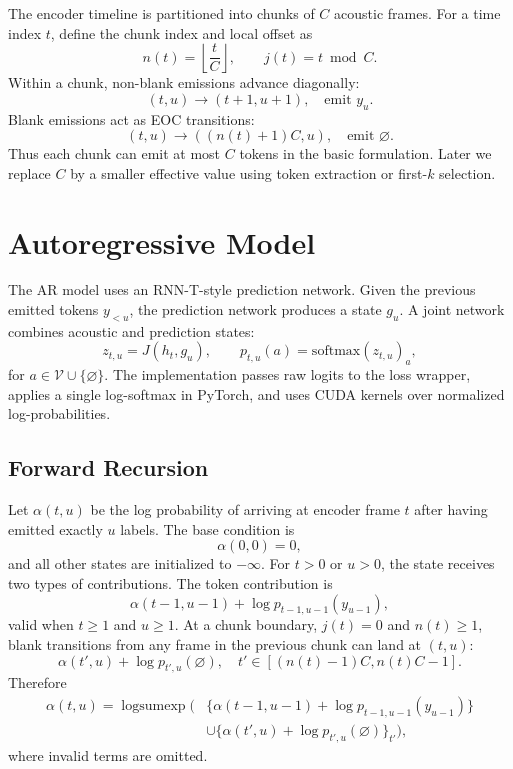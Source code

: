 \documentclass[conference]{IEEEtran}
\newcommand{\blank}{\varnothing}
\newcommand{\logsumexp}{\operatorname{logsumexp}}
\begin{document}
The encoder timeline is partitioned into chunks of $C$ acoustic frames. For a
time index $t$, define the chunk index and local offset as
\begin{equation}
  n(t) = \left\lfloor \frac{t}{C} \right\rfloor, \qquad
  j(t) = t \bmod C.
\end{equation}
Within a chunk, non-blank emissions advance diagonally:
\begin{equation}
  (t,u) \rightarrow (t+1,u+1), \quad \text{emit } y_u.
\end{equation}
Blank emissions act as EOC transitions:
\begin{equation}
  (t,u) \rightarrow ((n(t)+1)C, u), \quad \text{emit } \blank.
\end{equation}
Thus each chunk can emit at most $C$ tokens in the basic formulation. Later we
replace $C$ by a smaller effective value using token extraction or first-$k$
selection.

\section{Autoregressive Model}

The AR model uses an RNN-T-style prediction network. Given the previous emitted
tokens $y_{<u}$, the prediction network produces a state $g_u$. A joint network
combines acoustic and prediction states:
\begin{equation}
  z_{t,u} = J(h_t, g_u),
  \qquad
  p_{t,u}(a) = \mathrm{softmax}(z_{t,u})_a,
\end{equation}
for $a \in \mathcal{V} \cup \{\blank\}$. The implementation passes raw logits to
the loss wrapper, applies a single log-softmax in PyTorch, and uses CUDA kernels
over normalized log-probabilities.

\subsection{Forward Recursion}

Let $\alpha(t,u)$ be the log probability of arriving at encoder frame $t$ after
having emitted exactly $u$ labels. The base condition is
\begin{equation}
  \alpha(0,0) = 0,
\end{equation}
and all other states are initialized to $-\infty$. For $t>0$ or $u>0$, the state
receives two types of contributions. The token contribution is
\begin{equation}
  \alpha(t-1,u-1) + \log p_{t-1,u-1}(y_{u-1}),
\end{equation}
valid when $t \ge 1$ and $u \ge 1$. At a chunk boundary, $j(t)=0$ and
$n(t)\ge1$, blank transitions from any frame in the previous chunk can land at
$(t,u)$:
\begin{equation}
  \alpha(t',u) + \log p_{t',u}(\blank),
  \quad t' \in [(n(t)-1)C, n(t)C-1].
\end{equation}
Therefore
\begin{align}
  \alpha(t,u) =
  \logsumexp \Big(&
  \{\alpha(t-1,u-1)+\log p_{t-1,u-1}(y_{u-1})\} \nonumber\\
  &\cup
  \{\alpha(t',u)+\log p_{t',u}(\blank)\}_{t'} \Big),
\end{align}
where invalid terms are omitted.
\end{document}
